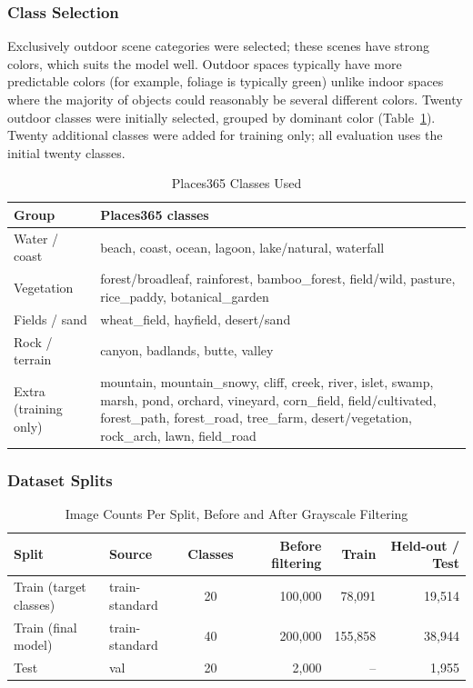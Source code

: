 \documentclass{article}
\begin{document}
\subsubsection{Class Selection}
Exclusively outdoor scene categories were selected; these scenes have strong colors, which suits the model well. Outdoor spaces typically have more predictable colors (for example, foliage is typically green) unlike indoor spaces where the majority of objects could reasonably be several different colors. Twenty outdoor classes were initially selected, grouped by dominant color (Table~\ref{tab:classes}). Twenty additional classes were added for training only; all evaluation uses the initial twenty classes.

\begin{table}[htbp]
\centering
\small
\begin{tabular}{lp{}}
\toprule
Group & Places365 classes \\
\midrule
Water / coast & beach, coast, ocean, lagoon, lake/natural, waterfall \\
Vegetation & forest/broadleaf, rainforest, bamboo\_forest, field/wild, pasture, rice\_paddy, botanical\_garden \\
Fields / sand & wheat\_field, hayfield, desert/sand \\
Rock / terrain & canyon, badlands, butte, valley \\
\midrule
Extra (training only) & mountain, mountain\_snowy, cliff, creek, river, islet, swamp, marsh, pond, orchard, vineyard, corn\_field, field/cultivated, forest\_path, forest\_road, tree\_farm, desert/vegetation, rock\_arch, lawn, field\_road \\
\bottomrule
\end{tabular}
\caption{Places365 Classes Used}
\label{tab:classes}
\end{table}

\subsubsection{Dataset Splits}

\begin{table}[htbp]
\centering
\begin{tabular}{llcrrr}
\toprule
Split & Source & Classes & Before filtering & Train & Held-out / Test \\
\midrule
Train (target classes) & train-standard & 20 & 100{,}000 & 78{,}091 & 19{,}514 \\
Train (final model) & train-standard & 40 & 200{,}000 & 155{,}858 & 38{,}944 \\
Test & val & 20 & 2{,}000 & -- & 1{,}955 \\
\bottomrule
\end{tabular}
\caption{Image Counts Per Split, Before and After Grayscale Filtering}
\label{tab:splits}
\end{table}
\end{document}
